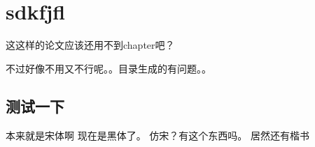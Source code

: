 \documentclass[a4paper, cs4size]{ctexbook}
\begin{document}
\frontmatter
{}

\tableofcontents
\setcounter{tocdepth}{2}








\mainmatter %

\chapter{sdkfjfl}
这这样的论文应该还用不到chapter吧？

不过好像不用又不行呢。。目录生成的有问题。。

\section{测试一下}

\songti 本来就是宋体啊
\heiti 现在是黑体了。
\fangsong 仿宋？有这个东西吗。
\kaishu 居然还有楷书




\backmatter 
{}




\end{document}

